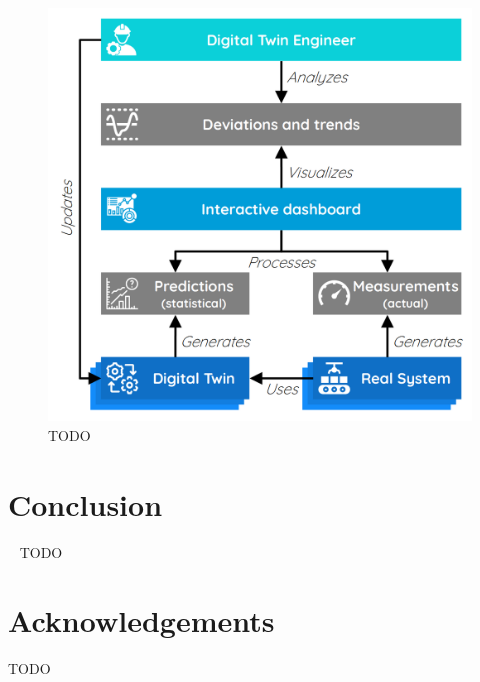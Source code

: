 \documentclass[9pt,conference]{IEEEtran}
\begin{document}
    \begin{figure}[htbp]
        \includegraphics[width=\columnwidth]{Continuous Quality Control.png}
        \caption{TODO}
        \label{todo-3}
    \end{figure}

    \section{Conclusion}~\label{section:conclusion}
    TODO

    \section*{Acknowledgements}
    TODO

    
    
\end{document}

